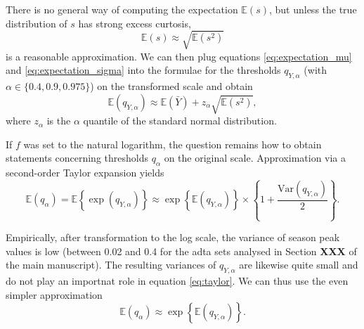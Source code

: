 \documentclass{article}
\newcommand{\sd}{s}
\newcommand{\mean}{\bar{Y}}
\begin{document}
There is no general way of computing the expectation $\mathbb{E}(\sd)$, but unless the true distribution of  $\sd$ has strong excess curtosis,
\begin{equation}
\mathbb{E}(\sd) \approx \sqrt{\mathbb{E}(\sd^2)}
\label{eq:expectation_sigma}
\end{equation}
is a reasonable approximation. We can then plug equations \eqref{eq:expectation_mu} and \eqref{eq:expectation_sigma} into the formulae for the thresholds $q_{Y, \alpha}$ (with $\alpha \in \{0.4, 0.9, 0.975\}$) on the transformed scale and obtain
$$
\mathbb{E}(q_{Y, \alpha}) \approx \mathbb{E}(\mean) + z_\alpha \sqrt{\mathbb{E}(\sd^2)},
$$
where $z_\alpha$ is the $\alpha$ quantile of the standard normal distribution.

If $f$ was set to the natural logarithm, the question remains how to obtain statements concerning thresholds $q_\alpha$ on the original scale. Approximation via a second-order Taylor expansion yields
\begin{equation}
\mathbb{E}(q_\alpha) = \mathbb{E}\left\{\exp(q_{Y, \alpha})\right\} \approx \exp\left\{\mathbb{E}(q_{Y, \alpha})\right\} \times \left\{1 + \frac{\text{Var}(q_{Y, \alpha})}{2} \right\}.
\label{eq:taylor}
\end{equation}

Empirically, after transformation to the log scale, the variance of season peak values is low (between 0.02 and 0.4 for the adta sets analysed in Section \textbf{XXX} of the main manuscript). The resulting variances of $q_{Y, \alpha}$ are likewise quite small and do not play an importnat role in equation \eqref{eq:taylor}. We can thus use the even simpler approximation
\begin{equation}
\mathbb{E}(q_\alpha) \approx \exp\left\{\mathbb{E}(q_{Y, \alpha})\right\}.
\end{equation}
\end{document}

